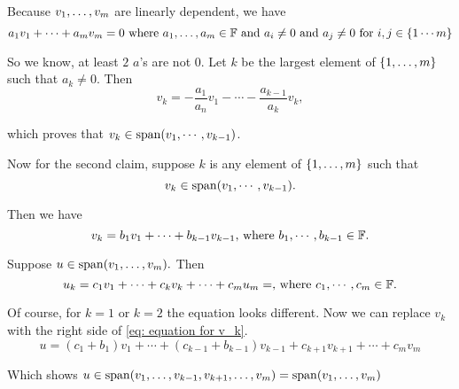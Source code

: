 \begin{prf}
  Because $v_1, \dots, v_m$ are linearly dependent, we have 
  \begin{equation}
    a_1 v_1 + \cdots + a_m v_m = 0 
    $ where $a_1, \ldots, a_m \in \myF$ and $a_i \neq 0$ and $a_j \neq 0 $ for $i,j \in \{1 \cdots m\}
  \end{equation} 
  
  So we know, at least $2$ $a$'s are not $0$. 
  Let $k$ be the largest element of $\{ 1, \ldots, m \}$ such that $a_k \neq 0$. Then
  \begin{equation}
    v_k = - \frac{a_1}{a_n}v_1 - \cdots - \frac{a_{k-1}}{a_k}v_k,
  \end{equation}
  
  which proves that $v_k \in \operatorname{span} (v_1, \cdots, v_{k-1})$.
  
  Now for the second claim, suppose $k$ is any element of $\{ 1, \ldots, m \}$ such that 
  \begin{equation}
    v_k \in \operatorname{span} (v_1, \cdots, v_{k-1}).
  \end{equation}
  
  Then we have 
  \begin{equation}
    v_k = b_1v_1 + \cdots + b_{k-1}v_{k-1}, $ where $b_1, \cdots, b_{k-1} \in \myF.
    \label{eq: equation for v_k}
  \end{equation}
  
  Suppose $u \in \operatorname{span} (v_1, \ldots, v_m).$ Then
  \begin{equation}
  u_k = c_1v_1 + \cdots + c_kv_k + \cdots +c_{m}u_{m} = , $ where $c_1, \cdots, c_{m} \in \myF.
  \end{equation}
  
  Of course, for $k=1$ or $k=2$ the equation looks different. Now we can replace $v_k$ with the right side of \ref{eq: equation for v_k}.
  \begin{equation}
    u = (c_1+b_1)v_1 + \cdots + (c_{k-1} + b_{k-1})v_{k-1} + c_{k+1} v_{k+1} + \cdots + c_m v_m
  \end{equation}
  
  Which shows $u \in \operatorname{span} (v_1, \dots, v_{k-1}, v_{k+1}, \dots, v_m) = \operatorname{span} (v_1, \dots, v_m)$
\end{prf}
\setcounter{thm}{21}

